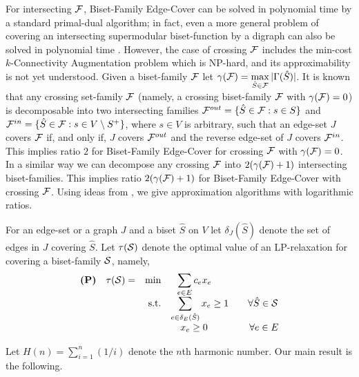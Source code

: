 For intersecting ${\cal F}$, {\sf Biset-Family Edge-Cover} can be solved in polynomial time by a 
standard primal-dual algorithm; in fact, even a more general problem of covering an intersecting supermodular 
biset-function by a digraph can also be solved in polynomial time \cite{F-R}. 
However, the case of crossing ${\cal F}$ includes the min-cost {\sf $k$-Connectivity Augmentation} problem
which is NP-hard, and its approxi\-mability is not yet understood.
Given a biset-family ${\cal F}$ let $\gamma({\cal F})=\max\limits_{\hat{S} \in {\cal F}}|\Gamma(\hat{S})|$.
It is known that any crossing set-family ${\cal F}$ 
(namely, a crossing biset-family ${\cal F}$ with $\gamma({\cal F})=0$) 
is decomposable into two intersecting families 
${\cal F}^{out}=\{\hat{S} \in {\cal F}:s \in S\}$ and 
${\cal F}^{in} =\{\hat{S} \in {\cal F}:s \in V \setminus S^+\}$, where $s \in V$ is arbitrary,
such that an edge-set $J$ covers ${\cal F}$ if, and only if, $J$ covers ${\cal F}^{out}$ 
and the reverse edge-set of $J$ covers ${\cal F}^{in }$.
This implies ratio $2$ for {\sf Biset-Family Edge-Cover} for crossing ${\cal F}$
with $\gamma({\cal F})=0$.
In a similar way we can decompose any crossing ${\cal F}$ into 
$2(\gamma({\cal F})+1)$ intersecting biset-families. 
This implies ratio $2(\gamma({\cal F})+1)$ for {\sf Biset-Family Edge-Cover} with crossing ${\cal F}$. 
Using ideas from \cite{RW,KN2,FL,N,N-subs}, we give approximation algorithms with logarithmic ratios.

For an edge-set or a graph $J$ and a biset $\hat{S}$ on $V$
let $\delta_J(\hat{S})$ denote the set of edges in $J$ covering $\hat{S}$. 
Let $\tau({\cal S})$ denote the optimal value of an LP-relaxation for covering
a biset-family ${\cal S}$, namely,
\[ \displaystyle
\begin{array} {llll} \mbox{\bf (P)}
& \tau({\cal S}) = & \min          & \ \ \displaystyle \sum_{e \in E} c_e x_e   \\
&                  & \ \mbox{s.t.} & \displaystyle \sum_{e \in \delta_E(\hat{S})} x_e \geq 1 
                                     \ \ \ \ \ \ \forall \hat{S} \in {\cal S}   \\
&                  &               & \ \ \ x_e \geq 0 \ \ \ \ \ \ \ \ \ \ \ \ \ \forall e \in E
\end{array}
\]

Let $H(n)=\sum_{i=1}^n (1/i)$ denote the $n$th harmonic number.
Our main result is the following.

\vspace{0.2cm}

